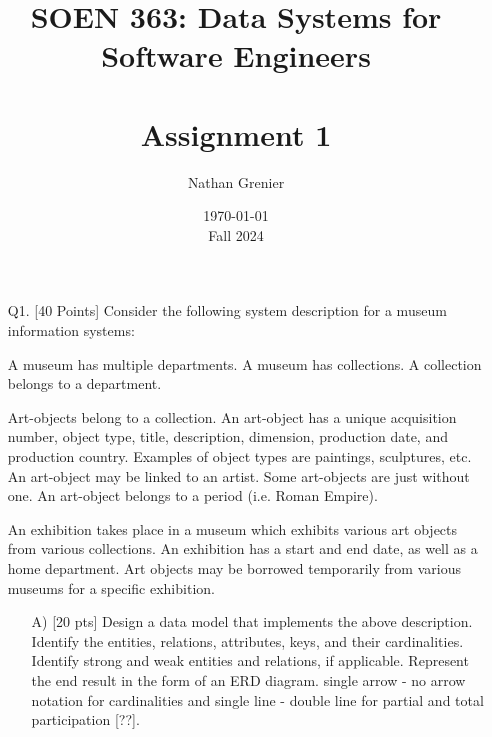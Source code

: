 \documentclass[12pt]{article}
\title{SOEN 363: Data Systems for Software Engineers\\
\ \\
Assignment 1}
\author{Nathan Grenier}
\date{\today \\ Fall 2024}
\begin{document}
\begin{spacing}{1.5}
      \maketitle

      \newpage

      \begin{enumerate}

            \item[Q1.] [40 Points] Consider the following system description for a museum information systems:

                  A museum has multiple departments. A museum has collections. A collection belongs to a department.

                  Art-objects belong to a collection. An art-object has a unique acquisition number, object type, title, description, dimension, production date, and production
                  country. Examples of object types are paintings, sculptures, etc. An art-object may be linked to an artist. Some art-objects are just without one. An art-object belongs to a period (i.e. Roman Empire).

                  An exhibition takes place in a museum which exhibits various art objects from various collections. An exhibition has a start and end date, as well as a home department. Art objects may be borrowed temporarily from various museums for a specific exhibition.

                  \begin{enumerate}

                        \item[A)] [20 pts] Design a data model that implements the above description. Identify the entities, relations, attributes, keys, and their cardinalities. Identify strong and weak entities and relations, if applicable. Represent the end result in the form of an ERD diagram. single arrow - no arrow notation for cardinalities and single line - double line for partial and total participation [??].


                              \newpage


\end{enumerate}
\end{enumerate}
\end{spacing}
\end{document}
